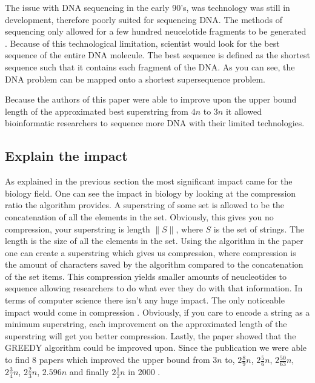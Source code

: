 \documentclass[letterpaper,twocolumn,11pt,titlepage]{article}
\begin{document}
The issue with DNA sequencing in the early 90's, was technology was still in development, therefore poorly suited for sequencing DNA. The methods of sequencing only allowed for a few hundred neucelotide fragments to be generated \cite{karp1993mapping}. Because of this technological limitation, scientist would look for the best sequence of the entire DNA molecule. The best sequence is defined as the shortest sequence such that it contains each fragment of the DNA. As you can see, the DNA problem can be mapped onto a shortest supersequence problem. 

Because the authors of this paper were able to improve upon the upper bound length of the approximated best superstring from $4n$ to $3n$ it allowed bioinformatic researchers to sequence more DNA with their limited technologies. 



\subsection*{Explain the impact}
As explained in the previous section the most significant impact came for the biology field. One can see the impact in biology by looking at the compression ratio the algorithm provides. A superstring of some set is allowed to be the concatenation of all the elements in the set. Obviously, this gives you no compression, your superstring is length $\| S \|$, where $S$ is the set of strings. The length is the size of all the elements in the set. Using the algorithm in the paper one can create a superstring which gives us compression, where compression is the amount of characters saved by the algorithm compared to the concatenation of the set items. This compression yields smaller amounts of neucleotides to sequence allowing researchers to do what ever they do with that information.  In terms of computer science there isn't any huge impact.  The only noticeable impact would come in compression \cite{storer1988data}. Obviously, if you care to encode a string as a minimum superstring, each improvement on the approximated length of the superstring will get you better compression. Lastly, the paper showed that the GREEDY algorithm could be improved upon. Since the publication we were able to find 8 papers which improved the upper bound from $3n$ to, $2 \frac{8}{9}n$, $2 \frac{5}{6}n$, $2 \frac{50}{63}n$, $2 \frac{3}{4}n$, $2 \frac{2}{3}n$, $2.596n$ and finally $2 \frac{1}{2}n$ in 2000 \cite{sweedyk2000boldmath}.
\end{document}
